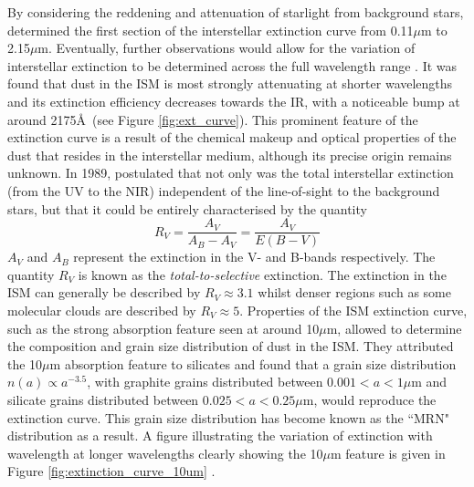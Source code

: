 By considering the reddening and attenuation of starlight from background stars,  \citet{Bless1972} determined the first section of the interstellar extinction curve from 0.11$\mu$m to 2.15$\mu$m.  Eventually, further observations would allow for the variation of interstellar extinction to be determined across the full wavelength range \citep{Rieke1985}.  It was found that dust in the ISM is most strongly attenuating at shorter wavelengths and its extinction efficiency decreases towards the IR, with a noticeable bump at around 2175\AA\ (see Figure \ref{fig:ext_curve}). This prominent feature of the extinction curve is a result of the chemical makeup and optical properties of the dust that resides in the interstellar medium, although its precise origin remains unknown.  In 1989, \citeauthor*{Cardelli1989} postulated that not only was the total interstellar extinction (from the UV to the NIR) independent of the line-of-sight to the background stars, but that it could be entirely characterised by the quantity
\begin{equation}
R_V=\frac{A_V}{A_B-A_V}=\frac{A_V}{E(B-V)}
\end{equation}
\noindent $A_V$ and $A_B$ represent the extinction in the V- and B-bands respectively. The quantity $R_V$ is known as the {\em total-to-selective} extinction.  The extinction in the ISM can generally be described by $R_V\approx3.1$ whilst denser regions such as some molecular clouds are described by $R_V\approx5$.  Properties of the ISM extinction curve, such as the strong absorption feature seen at around 10$\mu$m, allowed \citet*{Mathis1977} to determine the composition and grain size distribution of dust in the ISM.  They attributed the 10$\mu$m absorption feature to silicates and found that a grain size distribution $n(a) \propto a^{-3.5}$, with graphite grains distributed between $0.001<a<1\mu$m and silicate grains distributed between $0.025<a<0.25\mu$m, would reproduce the extinction curve.  This grain size distribution has become known as the ``MRN" distribution as a result.    A figure illustrating the variation of extinction with wavelength at longer wavelengths clearly showing the 10$\mu$m feature is given in Figure \ref{fig:extinction_curve_10um} \citep{Weingartner2001,Draine2003}.


